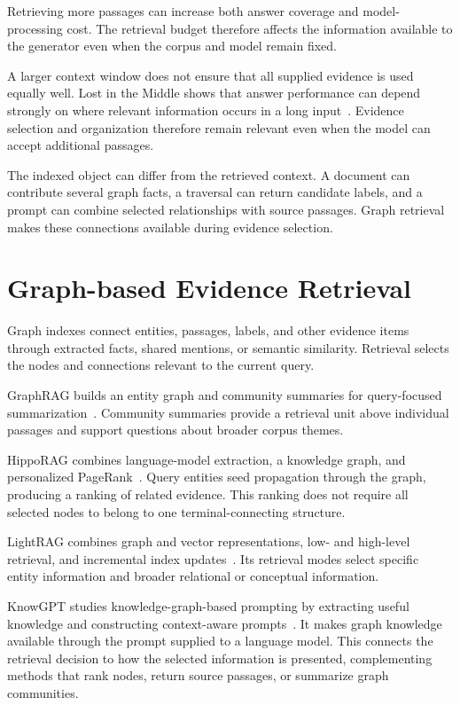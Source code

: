 Retrieving more passages can increase both answer coverage and model-processing cost. The retrieval budget therefore affects the information available to the generator even when the corpus and model remain fixed.

A larger context window does not ensure that all supplied evidence is used equally well. Lost in the Middle shows that answer performance can depend strongly on where relevant information occurs in a long input~\cite{lit-liu2024lost}. Evidence selection and organization therefore remain relevant even when the model can accept additional passages.

The indexed object can differ from the retrieved context. A document can contribute several graph facts, a traversal can return candidate labels, and a prompt can combine selected relationships with source passages. Graph retrieval makes these connections available during evidence selection.

\section{Graph-based Evidence Retrieval}
\label{sec:background:graph-retrieval}

Graph indexes connect entities, passages, labels, and other evidence items through extracted facts, shared mentions, or semantic similarity. Retrieval selects the nodes and connections relevant to the current query.

GraphRAG builds an entity graph and community summaries for query-focused summarization~\cite{bg-graphrag}. Community summaries provide a retrieval unit above individual passages and support questions about broader corpus themes.

HippoRAG combines language-model extraction, a knowledge graph, and personalized PageRank~\cite{bg-hipporag}. Query entities seed propagation through the graph, producing a ranking of related evidence. This ranking does not require all selected nodes to belong to one terminal-connecting structure.

LightRAG combines graph and vector representations, low- and high-level retrieval, and incremental index updates~\cite{bg-lightrag}. Its retrieval modes select specific entity information and broader relational or conceptual information.

KnowGPT studies knowledge-graph-based prompting by extracting useful knowledge and constructing context-aware prompts~\cite{lit-zhang2024knowgpt}. It makes graph knowledge available through the prompt supplied to a language model. This connects the retrieval decision to how the selected information is presented, complementing methods that rank nodes, return source passages, or summarize graph communities.

